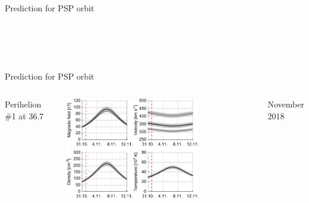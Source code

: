 \begin{frame}[plain,c]{Prediction for PSP orbit}{}
\begin{columns}[t]
		~\\
		~
		
	\end{columns}
\end{frame}
\begin{frame}[plain,c]{Prediction for PSP orbit}{}
	\begin{columns}[c]
	\column{\textwidth}
		
		\centering
		Perihelion \#1 at 36.7\,\Rs{}\\\ 
		
		\includegraphics[width=0.7\textwidth]{../talk_figures/SPP_perihelia_prediction_f_defense.pdf}
		
		
		November 2018

% 		
	
	\end{columns}
\end{frame}
